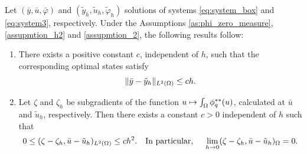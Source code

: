 \begin{theorem}\label{t:error_est}
	Let $(\bar y, \bar u, \bar \varphi)$ and $(\tilde y_h, \tilde u_h, \tilde\varphi_h)$ solutions of systems \eqref{eq:system_box} and \eqref{eq:system3}, respectively. Under the  Assumptions \ref{as:phi_zero_measure}, \ref{assupmtion_h2} and \ref{assupmtion_2}, the following results follow:
\begin{enumerate}
    \item There exists a positive constant $c$, independent of $h$,  such that  the corresponding optimal states satisfy
	\begin{equation}\label{eq:error_state}
		\lVert \bar y-\tilde y_h \rVert_{L^2(\Omega)} \leq c h.
	\end{equation}
 \item  Let $\zeta$ and $\zeta_h$ be subgradients of the function $u \mapsto \int_\Omega \phi_q^{**}(u)$, calculated at $\bar u$ and $\tilde u_h$, respectively. Then there exists a constant $c>0$ independent of $h$ such that
\begin{equation}\label{eq:corollary_1_1}
    0\leq (\zeta-\zeta_h,\bar u-\tilde u_h)_{L^2(\Omega)}\le ch^2. \quad \text{In particular, }\quad \lim_{h\to 0}(\zeta-\zeta_h,\bar u-\tilde u_h)_{\Omega}=0.
\end{equation}
\end{enumerate}
\end{theorem}
%

